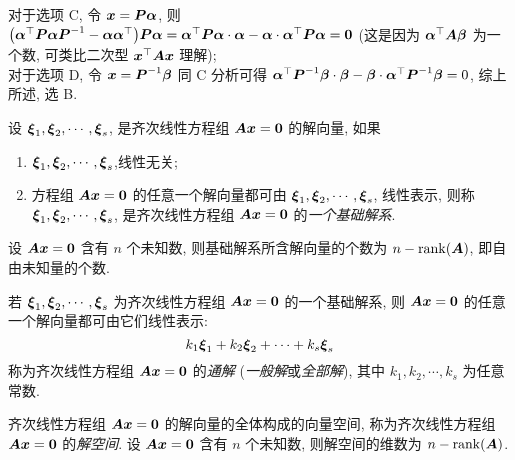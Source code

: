 \begin{solution}
    对于选项 C, 令 $\vb*{x}=\vb*{P\alpha}$, 则 $\qty(\vb*{\alpha}^\top\vb*{P}\vb*{\alpha P}^{-1}-\vb*{\alpha\alpha}^\top)\vb*{P\alpha}=\vb*{\alpha}^\top\vb*{P\alpha}\cdot\vb*{\alpha}-\vb*{\alpha}\cdot \vb*{\alpha}^\top\vb*{P\alpha}=\vb*{0}$ (这是因为 $\vb*{\alpha}^\top\vb*{A}\vb*{\beta}$ 为一个数, 可类比二次型 $\vb*{x}^\top\vb*{Ax}$ 理解);\\ 
    对于选项 D, 令 $\vb*{x}=\vb*{P}^{-1}\vb*{\beta}$ 同 C 分析可得 $\vb*{\alpha}^\top\vb*{P}^{-1}\vb*{\beta}\cdot\vb*{\beta}-\vb*{\beta}\cdot \vb*{\alpha}^\top\vb*{P}^{-1}\vb*{\beta}=0$, 综上所述, 选 B.
\end{solution}

\begin{definition}[齐次线性方程组的基础解系]
    设 $ \vb*{\xi}_1, \vb*{\xi}_2, \cdots ,\vb*{\xi}_s$, 是齐次线性方程组 $ \vb*{A x}=\vb*{0} $ 的解向量, 如果
    \begin{enumerate}[label=(\arabic{*})]
        \item $\vb*{\xi}_{1}, \vb*{\xi}_{2}, \cdots, \vb*{\xi}_s $,线性无关;
        \item 方程组 $ \vb*{A x}=\vb*{0} $ 的任意一个解向量都可由 $ \vb*{\xi}_{1}, \vb*{\xi}_{2}, \cdots, \vb*{\xi}_s $, 线性表示, 则称 $ \vb*{\xi}_{1}, \vb*{\xi}_{2}, \cdots, \vb*{\xi}_{s}$, 是齐次线性方程组 $\vb*{ A }\vb*{x}=\vb*{0} $ 的\textit{一个基础解系}.
    \end{enumerate}
\end{definition}

\begin{theorem}[基础解系的个数]
    设 $ \vb*{A x}=\vb*{0} $ 含有 $ n $ 个未知数, 则基础解系所含解向量的个数为 $ n-\rank(\vb*{A}) $, 即自由未知量的个数.
\end{theorem}

\begin{definition}[齐次方程组的通解]
    若 $ \vb*{\xi}_{1}, \vb*{\xi}_{2}, \cdots, \vb*{\xi}_{s} $ 为齐次线性方程组 $ \vb*{A x}=\vb*{0} $ 的一个基础解系, 则 $ \vb*{A x}=\vb*{0} $ 的任意一个解向量都可由它们线性表示:
    $$k_{1} \vb*{\xi}_{1}+k_{2} \vb*{\xi}_{2}+\cdots+k_{s} \vb*{\xi}_s$$
    称为齐次线性方程组 $ \vb*{A x}=\vb*{0} $ 的\textit{通解} (\textit{一般解}或\textit{全部解}), 其中 $ k_{1}, k_{2}, \cdots, k_s $ 为任意常数.
\end{definition}

\begin{definition}[齐次线性方程组的解空间]
    齐次线性方程组 $ \vb*{A x}=\vb*{0} $ 的解向量的全体构成的向量空间, 称为齐次线性方程组 $ \vb*{A x}=\vb*{0} $ 的\textit{解空间}. 设 $ \vb*{A} \vb*{x}=\vb*{0} $ 含有 $ n $ 个未知数, 则解空间的维数为 $ n-\rank(\vb*{A}) $.
\end{definition}

